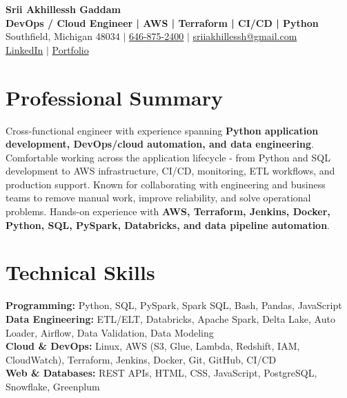 \documentclass[letterpaper,10pt]{article}
\begin{document}
\fontsize{9.35pt}{10.45pt}\selectfont

\begin{center}
    {\LARGE \textbf{Srii Akhillessh Gaddam}} \\[-1pt]
    \textbf{DevOps / Cloud Engineer | AWS | Terraform | CI/CD | Python} \\[2pt]
    Southfield, Michigan 48034 $|$
    \href{tel:6468752400}{646-875-2400} $|$
    \href{mailto:sriiakhillessh@gmail.com}{sriiakhillessh@gmail.com} \\[1pt]
    \href{https://www.linkedin.com/in/srii-akhiilessh-gaddam-b48668191/}{LinkedIn} $|$
    \href{https://sriiakhillesshg.github.io/portfolio/}{Portfolio}
\end{center}
\vspace{-8pt}

\section{Professional Summary}
\small{Cross-functional engineer with experience spanning \textbf{Python application development, DevOps/cloud automation, and data engineering}. Comfortable working across the application lifecycle - from Python and SQL development to AWS infrastructure, CI/CD, monitoring, ETL workflows, and production support. Known for collaborating with engineering and business teams to remove manual work, improve reliability, and solve operational problems. Hands-on experience with \textbf{AWS, Terraform, Jenkins, Docker, Python, SQL, PySpark, Databricks, and data pipeline automation}.}

\section{Technical Skills}
\small{
\textbf{Programming:} Python, SQL, PySpark, Spark SQL, Bash, Pandas, JavaScript \\
\textbf{Data Engineering:} ETL/ELT, Databricks, Apache Spark, Delta Lake, Auto Loader, Airflow, Data Validation, Data Modeling \\
\textbf{Cloud \& DevOps:} Linux, AWS (S3, Glue, Lambda, Redshift, IAM, CloudWatch), Terraform, Jenkins, Docker, Git, GitHub, CI/CD \\
\textbf{Web \& Databases:} REST APIs, HTML, CSS, JavaScript, PostgreSQL, Snowflake, Greenplum
}
\end{document}
